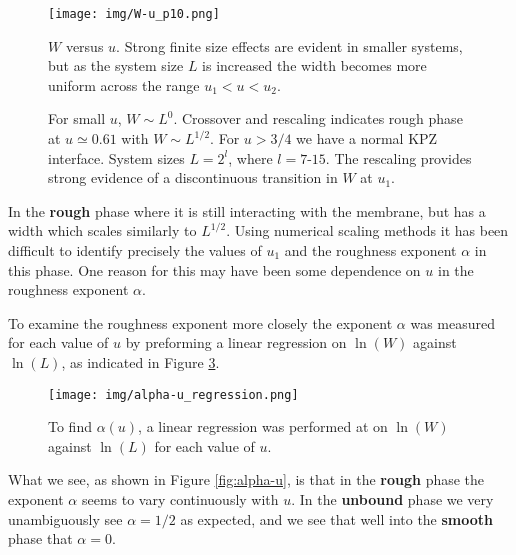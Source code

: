 \documentclass[a4paper,10pt]{article}
\newcommand{\fref}[1]{Figure \ref{#1}}
\begin{document}
\begin{figure}
 \centering
  \texttt{[image: img/W-u\_p10.png]}
  \caption{$W$ versus $u$. Strong finite size effects are evident in smaller systems, but as the system size $L$ is increased the width becomes more uniform across the range $u_1 < u < u_2$.}
  \label{fig:W-u_raw}
\end{figure}
\begin{figure}[h!]
  \centering
  \caption{For small $u$, $W \sim L^0$. Crossover and rescaling indicates rough phase at $u \simeq 0.61$ with $W \sim L^{1/2}$. For $u > 3/4$ we have a normal KPZ interface. System sizes $L = 2^l$, where $l = 7$-$15$. The rescaling provides strong evidence of a discontinuous transition in $W$ at $u_1$.}
  \label{fig:W-u}
\end{figure}
In the {\bf rough} phase where it is still interacting with the membrane, but has a width which scales similarly to $L^{1/2}$. Using numerical scaling methods it has been difficult to identify precisely the values of $u_1$ and the roughness exponent $\alpha$ in this phase. One reason for this may have been some dependence on $u$ in the roughness exponent $\alpha$. 

To examine the roughness exponent more closely the exponent $\alpha$ was measured for each value of $u$ by preforming a linear regression on $\ln(W)$ against $\ln(L)$, as indicated in \fref{fig:alpha-u_regression}. 
\begin{figure}[h!]
 \centering
 \texttt{[image: img/alpha-u\_regression.png]}
 \caption{To find $\alpha(u)$, a linear regression was performed at on $\ln(W)$ against $\ln(L)$ for each value of $u$.}
 \label{fig:alpha-u_regression}
\end{figure}

What we see, as shown in \fref{fig:alpha-u}, is that in the {\bf rough} phase the exponent $\alpha$ seems to vary continuously with $u$. In the {\bf unbound} phase we very unambiguously see $\alpha = 1/2$ as expected, and we see that well into the {\bf smooth} phase that $\alpha = 0$. 
\end{document}
